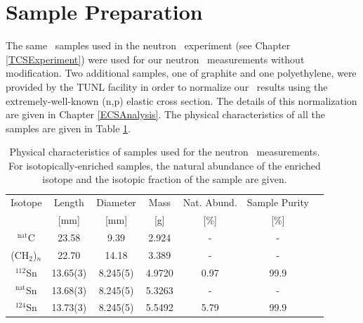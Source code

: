 \section{Sample Preparation}
The same \snTwelveNatFour\ samples used in the neutron \tot\ experiment (see Chapter
\ref{TCSExperiment}) were used for our neutron
\el\ measurements without modification. Two additional samples, one of graphite and one
polyethylene, were provided by the TUNL facility in order to normalize our \el\
results using the extremely-well-known (n,p) elastic cross section. The
details of this normalization are given in Chapter \ref{ECSAnalysis}.
The physical characteristics of all the samples are given in Table \ref{ECSSampleTable}.

\begin{table}[ht]
    \caption[Physical characteristics of samples used for neutron \el\
    measurements]
    {
        Physical characteristics of samples used for the neutron \el\
        measurements. For isotopically-enriched samples, the natural abundance
        of the enriched isotope and the isotopic fraction of the sample are
        given.
    }
    \label{ECSSampleTable}
    \begin{center}
        \begin{tabular}{ c c c c c c c }
            \hline
            Isotope & Length & Diameter
            & Mass & Nat. Abund. & Sample Purity\\
                 & [mm] & [mm] & [g] & [\%] & [\%]\\
            \hline

            $^{\text{nat}}$C & 23.58 & 9.39 & 2.924 & - & -\\
            (CH$_{2}$)$_{n}$ & 22.70 & 14.18 & 3.389 & - & -\\

            $^{112}$Sn & 13.65(3) & 8.245(5) &
            4.9720 & 0.97 & 99.9\\
            $^{\text{nat}}$Sn & 13.68(3) & 8.245(5) &
            5.3263 & - & -\\
            $^{124}$Sn & 13.73(3) & 8.245(5) &
            5.5492 & 5.79 & 99.9\\

            \hline
        \end{tabular}
    \end{center}
\end{table}

